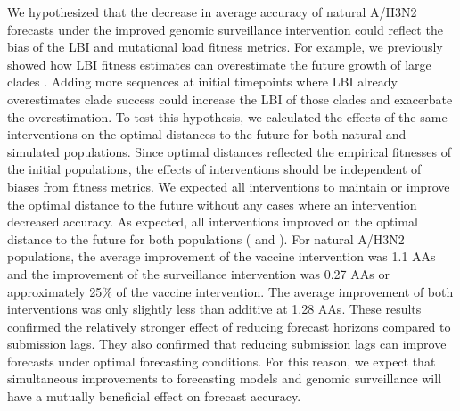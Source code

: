 \documentclass[9pt,lineno]{elife}
\begin{document}
We hypothesized that the decrease in average accuracy of natural A/H3N2 forecasts under the improved genomic surveillance intervention could reflect the bias of the LBI and mutational load fitness metrics.
For example, we previously showed how LBI fitness estimates can overestimate the future growth of large clades \citep{Huddleston2020}.
Adding more sequences at initial timepoints where LBI already overestimates clade success could increase the LBI of those clades and exacerbate the overestimation.
To test this hypothesis, we calculated the effects of the same interventions on the optimal distances to the future for both natural and simulated populations.
Since optimal distances reflected the empirical fitnesses of the initial populations, the effects of interventions should be independent of biases from fitness metrics.
We expected all interventions to maintain or improve the optimal distance to the future without any cases where an intervention decreased accuracy.
As expected, all interventions improved on the optimal distance to the future for both populations ( and ).
For natural A/H3N2 populations, the average improvement of the vaccine intervention was 1.1 AAs and the improvement of the surveillance intervention was 0.27 AAs or approximately 25\% of the vaccine intervention.
The average improvement of both interventions was only slightly less than additive at 1.28 AAs.
These results confirmed the relatively stronger effect of reducing forecast horizons compared to submission lags.
They also confirmed that reducing submission lags can improve forecasts under optimal forecasting conditions.
For this reason, we expect that simultaneous improvements to forecasting models and genomic surveillance will have a mutually beneficial effect on forecast accuracy.
\end{document}
